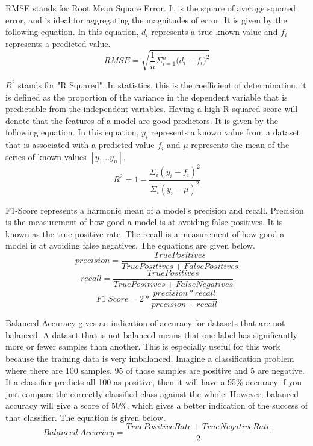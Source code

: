 \par
RMSE stands for Root Mean Square Error.
It is the square of average squared error, and is ideal for aggregating the magnitudes of error.
It is given by the following equation. In this equation, $d_i$ represents a true known value and $f_i$ represents a predicted value.
\begin{equation}
    RMSE = \sqrt{\frac{1}{n}\Sigma_{i=1}^{n}{\Big(d_i -f_i)^2}}
\end{equation}

\par
$R^2$ stands for "R Squared".
In statistics, this is the coefficient of determination, it is defined as the proportion of the variance in the dependent variable that is predictable from the independent variables.
Having a high R squared score will denote that the features of a model are good predictors.
It is given by the following equation. In this equation, $y_i$ represents a known value from a dataset that is associated with a predicted value $f_i$ and $\mu$ represents the mean of the series of known values \([y_1...y_n]\).
\begin{equation}
    R^2 = 1 - \frac{\Sigma_i{(y_i - f_i)}^2}{\Sigma_i{(y_i - \mu)}^2}
\end{equation}

\par
F1-Score represents a harmonic mean of a model's precision and recall.
Precision is the measurement of how good a model is at avoiding false positives.
It is known as the true positive rate.
The recall is a measurement of how good a model is at avoiding false negatives.
The equations are given below.
\begin{equation}
    precision = \frac{True Positives}{True Positives + False Positives}
\end{equation}
\begin{equation}
    recall = \frac{True Positives}{True Positives + False Negatives}
\end{equation}
\begin{equation}
    F1\ Score = 2 * \frac{precision * recall}{precision + recall}
\end{equation}

\par
Balanced Accuracy gives an indication of accuracy for datasets that are not balanced.
A dataset that is not balanced means that one label has significantly more or fewer samples than another.
This is especially useful for this work because the training data is very imbalanced.
Imagine a classification problem where there are 100 samples.
95 of those samples are positive and 5 are negative.
If a classifier predicts all 100 as positive, then it will have a 95\% accuracy if you just compare the correctly classified class against the whole.
However, balanced accuracy will give a score of 50\%, which gives a better indication of the success of that classifier.
The equation is given below.
\begin{equation}
    Balanced\ Accuracy = \frac{True Positive Rate + True Negative Rate}{2}
\end{equation}





